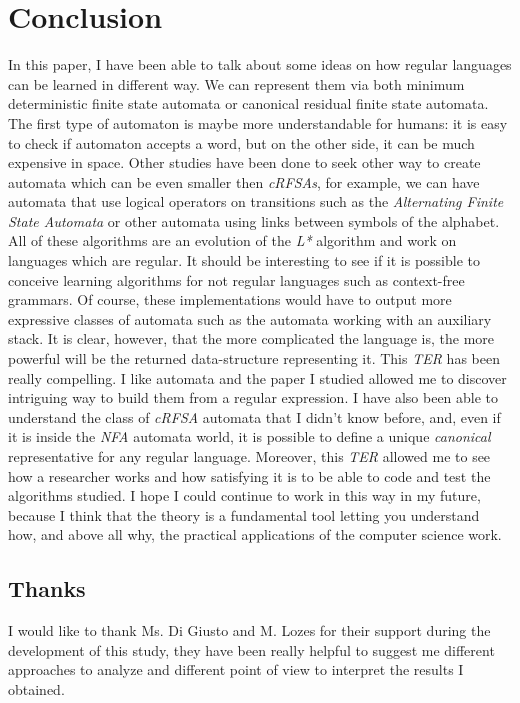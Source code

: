 \section{Conclusion}

In this paper, I have been able to talk about some ideas on how regular languages can be learned in
different way. We can represent them via both minimum deterministic finite state automata or
canonical residual finite state automata. The first type of automaton is maybe more understandable for
humans: it is easy to check if automaton accepts a word, but on the other side, it can be much
expensive in space.
Other studies have been done to seek other way to create automata which can be even smaller
then \textit{cRFSAs}, for example, we can have automata that use logical operators on transitions such as the
\textit{Alternating Finite State Automata} or other automata using links between symbols of the alphabet.
All of these algorithms are an evolution of the \textit{L*} algorithm and work on languages which are regular.
It should be interesting to see if it is possible to conceive learning algorithms for not regular languages
such as context-free grammars. Of course, these implementations would have to output more expressive
classes of automata such as the automata working with an auxiliary stack. It is clear, however, that the
more complicated the language is, the more powerful will be the returned data-structure representing it.
This \textit{TER} has been really compelling. I like automata and the paper I studied allowed me to discover
intriguing way to build them from a regular expression. I have also been able to understand the class of
\textit{cRFSA} automata that I didn’t know before, and, even if it is inside the \textit{NFA} automata world, it is possible
to define a unique \textit{canonical} representative for any regular language. Moreover, this \textit{TER} allowed me to
see how a researcher works and how satisfying it is to be able to code and test the algorithms studied. I
hope I could continue to work in this way in my future, because I think that the theory is a fundamental
tool letting you understand how, and above all why, the practical applications of the computer science
work.


\subsection{Thanks}
I would like to thank Ms. Di Giusto and M. Lozes for their support during the development of this study, they have been really helpful to suggest me different approaches to analyze and different point of view to interpret the results I obtained.